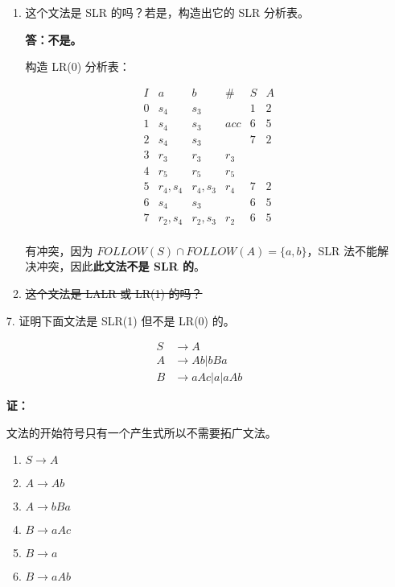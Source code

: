 \begin{enumerate}
\begin{enumerate}
        \item 这个文法是 SLR 的吗？若是，构造出它的 SLR 分析表。
        
        \textbf{答：不是。}
        
        构造 LR(0) 分析表：
        
        \begin{equation*}
            \begin{array}{c|ccc|cc}
                I & a & b & \# & S & A \\
                \hline
                0 & s_4 & s_3 & & 1 & 2 \\
                1 & s_4 & s_3 & acc & 6 & 5 \\
                2 & s_4 & s_3 & & 7 & 2 \\
                3 & r_3 & r_3 & r_3 & & \\
                4 & r_5 & r_5 & r_5 & & \\
                5 & r_4, s_4 & r_4, s_3 & r_4 & 7 & 2 \\
                6 & s_4 & s_3 & & 6 & 5 \\
                7 & r_2, s_4 & r_2, s_3 & r_2 & 6 & 5\\
            \end{array}
        \end{equation*}
        
        有冲突，因为 $FOLLOW(S) \cap FOLLOW(A) = \{a, b\}$，SLR 法不能解决冲突，因此\textbf{此文法不是 SLR 的}。
        
        \item \sout{这个文法是 LALR 或 LR(1) 的吗？}
    \end{enumerate}
    
    \item[7.] 证明下面文法是 SLR(1) 但不是 LR(0) 的。
    
    \begin{align*}
        S & \to A \\
        A & \to Ab | bBa \\
        B & \to aAc | a | aAb
    \end{align*}
    
    \textbf{证：}
    
    文法的开始符号只有一个产生式所以不需要拓广文法。
    
    \begin{enumerate}[(1)]
        \item $S \to A$
        \item $A \to Ab$
        \item $A \to bBa$
        \item $B \to aAc$
        \item $B \to a$
        \item $B \to aAb$
    \end{enumerate}
    

\end{enumerate}
